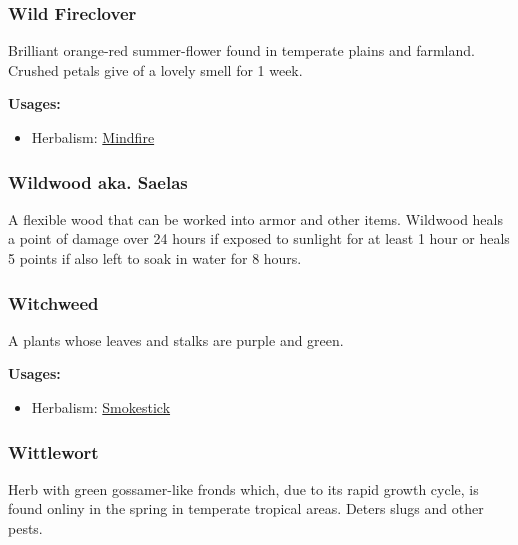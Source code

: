 \subsubsection{Wild Fireclover}
\label{Wild Fireclover}

Brilliant orange-red summer-flower found in temperate plains and farmland. Crushed petals give of a lovely smell for 1 week.

\vspace{5mm}

\textbf{Usages:}

\begin{itemize}[noitemsep]
\item[] Herbalism: \hyperref[Mindfire]{Mindfire}
\end{itemize}

\subsubsection{Wildwood aka. Saelas}

A flexible wood that can be worked into armor and other items. Wildwood heals a point of damage over 24 hours if exposed to sunlight for at least 1 hour or heals 5 points if also left to soak in water for 8 hours.

\subsubsection{Witchweed}
\label{Witchweed}

A plants whose leaves and stalks are purple and green.

\vspace{5mm}

\textbf{Usages:}

\begin{itemize}[noitemsep]
\item[] Herbalism: \hyperref[Smokestick]{Smokestick}
\end{itemize}

\subsubsection{Wittlewort}
\label{Wittlewort}

Herb with green gossamer-like fronds which, due to its rapid growth cycle, is found onliny in the spring in temperate tropical areas. Deters slugs and other pests.

\vspace{5mm}


